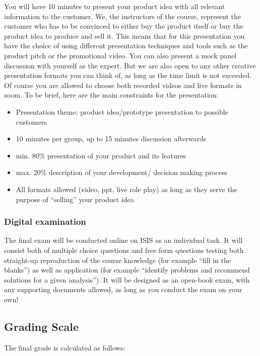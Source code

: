 \documentclass[headinclude=true]{scrartcl}
\begin{document}
You will have 10 minutes to present your product idea with all relevant information to the customer. We, the instructors of the course, represent the customer who has to be convinced to either buy the product itself or buy the product idea to produce and sell it. 
This means that for this presentation you have the choice of using different presentation techniques and tools such as the product pitch or the promotional video. You can also present a mock panel discussion with yourself as the expert. But we are also open to any other creative presentation formats you can think of, as long as the time limit is not exceeded. Of course you are allowed to choose both recorded videos and live formats in zoom. To be brief, here are the main constraints for the presentation:
\begin{itemize}
    \item Presentation theme: product idea/prototype presentation to possible customers
    \item 10 minutes per group, up to 15 minutes discussion afterwards
    \item min. 80\% presentation of your product and its features
    \item max. 20\% description of your development/ decision making process 
    \item All formats allowed (video, ppt, live role play) as long as they serve the purpose of ``selling'' your product idea

\end{itemize}


\subsubsection{Digital examination}

The final exam will be conducted online on ISIS as an individual task. It will consist both of multiple choice questions and free form questions testing both straight-up reproduction of the course knowledge (for example ``fill in the blanks'') as well as application (for example ``identify problems and recommend solutions for a given analysis''). It will be designed as an open-book exam, with any supporting documents allowed, as long as you conduct the exam on your own!

\subsection{Grading Scale}

The final grade is calculated as follows:
\end{document}
